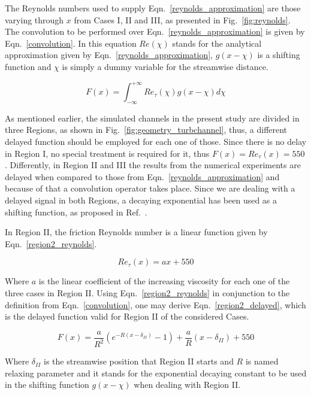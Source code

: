 \documentclass[twocolumn,10pt]{asme2e}
\begin{document}
The Reynolds numbers used to supply Eqn.~\ref{reynolds_approximation} are those varying through \(x\) from Cases I, II and III, as presented in Fig.~\ref{fig:reynolds}. The convolution to be performed over Eqn.~\ref{reynolds_approximation} is given by Eqn.~\ref{convolution}. In this equation \(Re(\chi)\) stands for the analytical approximation given by Eqn.~\ref{reynolds_approximation}, \(g(x-\chi)\)  is a shifting function and \(\chi\) is simply a dummy variable for the streamwise distance.

\begin{equation}
F(x) =  \int_{-\infty}^{+\infty} Re_{\tau}(\chi)g(x-\chi)d\chi
\label{convolution}
\end{equation}

As mentioned earlier, the simulated channels in the present study are divided in three Regions, as shown in Fig.~\ref{fig:geometry_turbchannel}, thus, a different delayed function should be employed for each one of those. Since there is no delay in Region I, no special treatment is required for it, thus \(F(x)=Re_{\tau}(x)=550\). Differently, in Region II and III the results from the numerical experiments are delayed when compared to those from Eqn.~\ref{reynolds_approximation} and because of that a convolution operator takes place. Since we are dealing with a delayed signal in both Regions, a decaying exponential has been used as a shifting function, as proposed in Ref.~\cite{signals}.

In Region II, the friction Reynolds number is a linear function given by Eqn.~\ref{region2_reynolds}.

\begin{equation}
Re_{\tau}(x)=ax+550
\label{region2_reynolds}
\end{equation}

Where \(a\) is the linear coefficient of the increasing viscosity for each one of the three cases in Region II. Using Eqn.~\ref{region2_reynolds} in conjunction to the definition from Eqn.~\ref{convolution}, one may derive Eqn.~\ref{region2_delayed}, which is the delayed function valid for Region II of the considered Cases.

\begin{equation}
F(x)= \frac{a}{R^2}(e^{-R(x-{\delta}_{II})}-1)+\frac{a}{R}(x-{\delta}_{II})+550
\label{region2_delayed}
\end{equation}

Where \({\delta}_{II}\) is the streamwise position that Region II starts and \(R\) is named relaxing parameter and it stands for the exponential decaying constant to be used in the shifting function \(g(x-\chi)\) when dealing with Region II.
\end{document}
